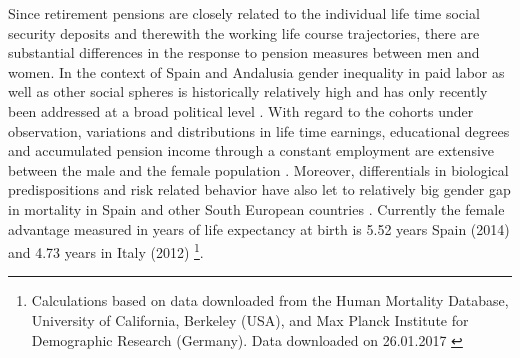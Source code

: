 \documentclass[a4paper,10pt,oneside,english]{article}
\begin{document}
Since retirement pensions are closely related to the individual life time social security deposits and therewith the working life course trajectories, there are substantial differences in the response to pension measures between men and women. In the context of Spain and Andalusia gender inequality in paid labor as well as other social spheres is historically relatively high and has only recently been addressed at a broad political level \citep{guner2014gender}. With regard to the cohorts under observation, variations and distributions in life time earnings, educational degrees and accumulated pension income through a constant employment are extensive between the male and the female population \citep{gonzalez2014gender}. Moreover, differentials in biological predispositions and risk related behavior have also let to relatively big gender gap in mortality in Spain and other South European countries \citep{caselli2010increasing,gjoncca2005sex,cockerham2005health}. Currently the female advantage measured in years of life expectancy at birth is 5.52 years Spain (2014) and 4.73 years in Italy (2012) \footnote{Calculations based on data downloaded from the Human Mortality Database, University of California, Berkeley (USA), and Max Planck Institute for Demographic Research (Germany). Data downloaded on 26.01.2017 \citep{RN21}}. 

\end{document}
